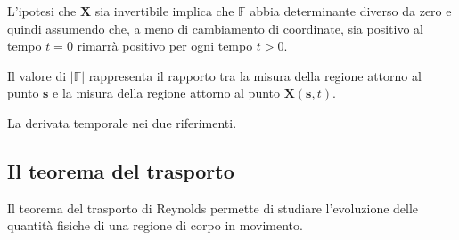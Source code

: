 L'ipotesi che $\mathbf{X}$ sia invertibile implica che $\mathbb{F}$ abbia determinante diverso da zero e quindi assumendo che, a meno di cambiamento di coordinate, sia positivo al tempo $t=0$ rimarrà positivo per ogni tempo $t>0$.

Il valore di $|\mathbb{F}|$ rappresenta il rapporto tra la misura della regione attorno al punto $\mathbf{s}$ e la misura della regione attorno al punto $\mathbf{X}(\mathbf{s},t)$.

La derivata temporale nei due riferimenti.

\subsection{Il teorema del trasporto}

Il teorema del trasporto di Reynolds permette di studiare l'evoluzione delle quantità fisiche di una regione di corpo in movimento.

